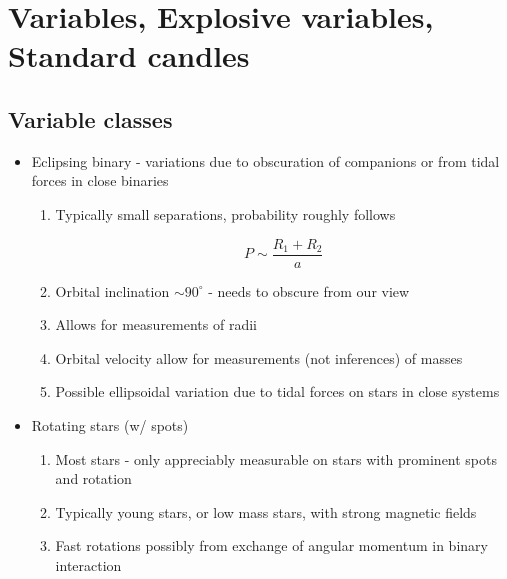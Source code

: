 \documentclass{article}
\begin{document}
\section{Variables, Explosive variables, Standard candles}

\subsection{Variable classes}

\begin{itemize}
    \item Eclipsing binary - variations due to obscuration of companions or from tidal forces in close binaries
        \begin{enumerate}
            \item Typically small separations, probability roughly follows

            \begin{equation}
                P \sim \frac{R_1 + R_2}{a}
            \end{equation}

            \item Orbital inclination $\sim 90^\circ$ - needs to obscure from our view

            \item Allows for measurements of radii

            \item Orbital velocity allow for measurements (not inferences) of masses

            \item Possible ellipsoidal variation due to tidal forces on stars in close systems
        \end{enumerate}


        \item Rotating stars (w/ spots)

        \begin{enumerate}
            \item Most stars - only appreciably measurable on stars with prominent spots and rotation

            \item Typically young stars, or low mass stars, with strong magnetic fields

            \item Fast rotations possibly from exchange of angular momentum in binary interaction
        \end{enumerate}


\end{itemize}
\end{document}

